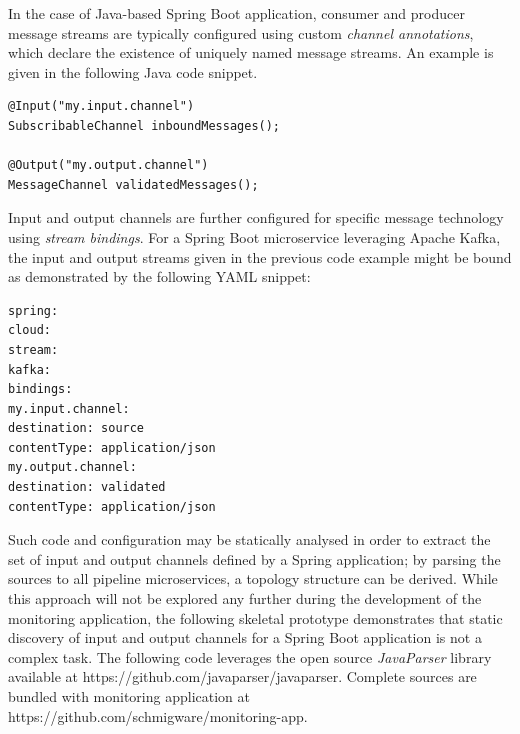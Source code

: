 In the case of Java-based Spring Boot application, consumer and producer message streams are typically configured using custom \textit{channel annotations}, which declare the existence of uniquely named message streams. An example is given in the following Java code snippet.

\vspace{5mm}

\begin{lstlisting}[caption={Spring Boot Cloud Channel Annotations}]
@Input("my.input.channel")
SubscribableChannel inboundMessages();   

@Output("my.output.channel")
MessageChannel validatedMessages();
\end{lstlisting}

Input and output channels are further configured for specific message technology using \textit{stream bindings}. For a Spring Boot microservice leveraging Apache Kafka, the input and output streams given in the previous code example might be bound as demonstrated by the following YAML snippet:

\vspace{5mm}

\begin{lstlisting}[caption={Spring Boot Cloud Channel Binding Configuration}]
spring:
cloud:
stream:
kafka:
bindings:
my.input.channel:
destination: source
contentType: application/json
my.output.channel:
destination: validated
contentType: application/json
\end{lstlisting}

Such code and configuration may be statically analysed in order to extract the set of input and output channels defined by a Spring application; by parsing the sources to all pipeline microservices, a topology structure can be derived. While this approach will not be explored any further during the development of the monitoring application, the following skeletal prototype demonstrates that static discovery of input and output channels for a Spring Boot application is not a complex task. The following code leverages the open source \textit{JavaParser} library available at https://github.com/javaparser/javaparser. Complete sources are bundled with monitoring application at \newline https://github.com/schmigware/monitoring-app.

\vspace{5mm}


